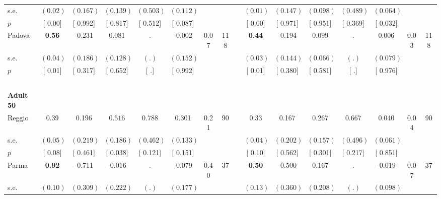 \begin{longtable}{L{8em} c c c c c c c p{1em} c c c c c c c}
\quad \quad \quad \quad s.e.& $ (     0.02)$ & $ (    0.167)$ & $ (    0.139)$ & $ (    0.503)$ & $ (    0.112)$ & & & & $ (     0.01)$ & $ (    0.147)$ & $ (    0.098)$ & $ (    0.489)$ & $ (    0.064)$ & &  \\*
\quad \quad \quad \quad $ p$ & [     0.00] & [    0.992] & [    0.817] & [    0.512] & [    0.087] & & & & [     0.00] & [    0.971] & [    0.951] & [    0.369] & [    0.032] & &  \\[1em]
\quad \quad \quad Padova& \textbf{     0.56} &    -0.231 &     0.081 &         . &    -0.002 &      0.07 &       118 & & \textbf{     0.44} &    -0.194 &     0.099 &         . &     0.006 &      0.03 &       118  \\*
\quad \quad \quad \quad s.e.& $ (     0.04)$ & $ (    0.186)$ & $ (    0.128)$ & $ (        .)$ & $ (    0.152)$ & & & & $ (     0.03)$ & $ (    0.144)$ & $ (    0.066)$ & $ (        .)$ & $ (    0.079)$ & &  \\*
\quad \quad \quad \quad $ p$ & [     0.01] & [    0.317] & [    0.652] & [        .] & [    0.992] & & & & [     0.01] & [    0.380] & [    0.581] & [        .] & [    0.976] & &  \\[1em]
~\\[1em]
\quad \quad \textbf{Adult 50} & & & & & & & & & & & & & & & \\* 
\quad \quad \quad Reggio& 0.39 &     0.196 & $ \mathbf{    0.516}$ &     0.788 &     0.301 &      0.21 &        90 & & 0.33 &     0.167 &     0.267 &     0.667 &     0.040 &      0.04 &        90  \\*
\quad \quad \quad \quad s.e.& $ (     0.05)$ & $ (    0.219)$ & $ (    0.186)$ & $ (    0.462)$ & $ (    0.133)$ & & & & $ (     0.04)$ & $ (    0.202)$ & $ (    0.157)$ & $ (    0.496)$ & $ (    0.061)$ & &  \\*
\quad \quad \quad \quad $ p$ & [     0.08] & [    0.461] & [    0.038] & [    0.121] & [    0.151] & & & & [     0.10] & [    0.562] & [    0.301] & [    0.217] & [    0.851] & &  \\[1em]
\quad \quad \quad Parma& \textbf{     0.92} &    -0.711 &    -0.016 &         . &    -0.079 &      0.40 &        37 & & \textbf{     0.50} &    -0.500 &     0.167 &         . &    -0.019 &      0.07 &        37  \\*
\quad \quad \quad \quad s.e.& $ (     0.10)$ & $ (    0.309)$ & $ (    0.222)$ & $ (        .)$ & $ (    0.177)$ & & & & $ (     0.13)$ & $ (    0.360)$ & $ (    0.208)$ & $ (        .)$ & $ (    0.098)$ & &  \\*

\end{longtable}
